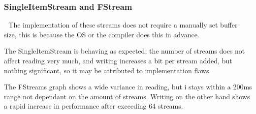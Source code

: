 \subsubsection{SingleItemStream and FStream}
\includegraphics[width=0.5]{SIS.png}
\includegraphics[width=0.5]{FS.png}
The implementation of these streams does not require a manually set buffer size, this is because the OS or the compiler does this in advance. 

The SingleItemStream is behaving as expected; the number of streams does not affect reading very much, and writing increases a bit per stream added, but nothing significant, so it may be attributed to implementation flaws. 

The FStreams graph shows a wide variance in reading, but i stays within a 200ms range not dependant on the amount of streams. Writing on the other hand shows a rapid increase in performance after exceeding 64 streams. 


